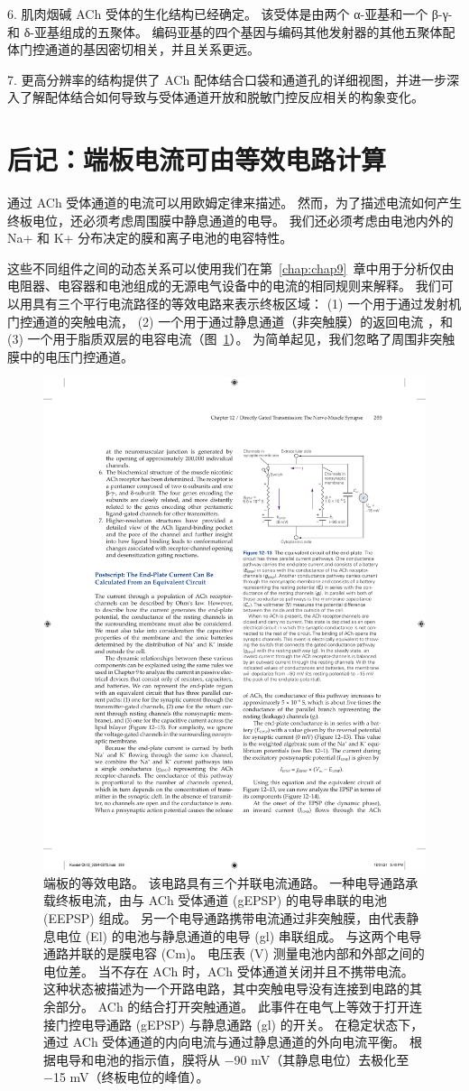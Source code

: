 6. 肌肉烟碱 ACh 受体的生化结构已经确定。
该受体是由两个 α-亚基和一个 β-γ-和 δ-亚基组成的五聚体。
编码亚基的四个基因与编码其他发射器的其他五聚体配体门控通道的基因密切相关，并且关系更远。 


7. 更高分辨率的结构提供了 ACh 配体结合口袋和通道孔的详细视图，并进一步深入了解配体结合如何导致与受体通道开放和脱敏门控反应相关的构象变化。


\section{后记：端板电流可由等效电路计算}

通过 ACh 受体通道的电流可以用欧姆定律来描述。
然而，为了描述电流如何产生终板电位，还必须考虑周围膜中静息通道的电导。
我们还必须考虑由电池内外的 Na+ 和 K+ 分布决定的膜和离子电池的电容特性。


这些不同组件之间的动态关系可以使用我们在第~\ref{chap:chap9}~章中用于分析仅由电阻器、电容器和电池组成的无源电气设备中的电流的相同规则来解释。
我们可以用具有三个平行电流路径的等效电路来表示终板区域：
(1) 一个用于通过发射机门控通道的突触电流，
(2) 一个用于通过静息通道（非突触膜）的返回电流 ，和 
(3) 一个用于脂质双层的电容电流（图~\ref{fig:12_13}）。 
为简单起见，我们忽略了周围非突触膜中的电压门控通道。


\begin{figure}[htbp]
	\centering
	\includegraphics[width=0.5\linewidth]{chap12/fig_12_13}
	\caption{端板的等效电路。 该电路具有三个并联电流通路。 一种电导通路承载终板电流，由与 ACh 受体通道 (gEPSP) 的电导串联的电池 (EEPSP) 组成。 另一个电导通路携带电流通过非突触膜，由代表静息电位 (El) 的电池与静息通道的电导 (gl) 串联组成。 与这两个电导通路并联的是膜电容 (Cm)。 电压表 (V) 测量电池内部和外部之间的电位差。 当不存在 ACh 时，ACh 受体通道关闭并且不携带电流。 这种状态被描述为一个开路电路，其中突触电导没有连接到电路的其余部分。 ACh 的结合打开突触通道。 此事件在电气上等效于打开连接门控电导通路 (gEPSP) 与静息通路 (gl) 的开关。 在稳定状态下，通过 ACh 受体通道的内向电流与通过静息通道的外向电流平衡。 根据电导和电池的指示值，膜将从 −90 mV（其静息电位）去极化至 −15 mV（终板电位的峰值）。}
	\label{fig:12_13}
\end{figure}


